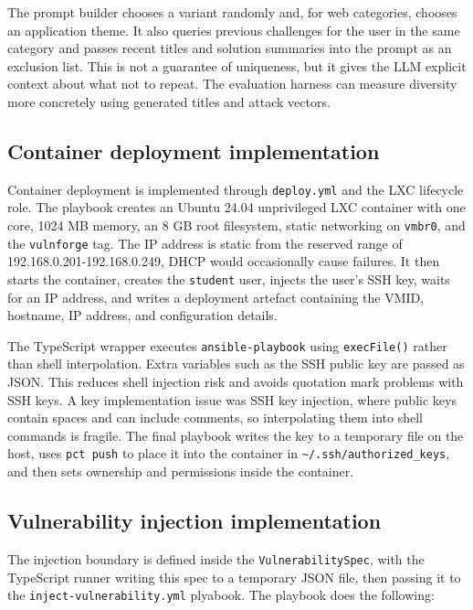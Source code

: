 The prompt builder chooses a variant randomly and, for web categories, chooses an application theme. It also queries previous challenges for the user in the same category and passes recent titles and solution summaries into the prompt as an exclusion list. This is not a guarantee of uniqueness, but it gives the LLM explicit context about what not to repeat. The evaluation harness can measure diversity more concretely using generated titles and attack vectors.

\subsection{Container deployment implementation}\label{sec:container-deployment}

Container deployment is implemented through \lstinline|deploy.yml| and the LXC lifecycle role. The playbook creates an Ubuntu 24.04 unprivileged LXC container with one core, 1024 MB memory, an 8 GB root filesystem, static networking on \lstinline|vmbr0|, and the \lstinline|vulnforge| tag. The IP address is static from the reserved range of 192.168.0.201-192.168.0.249, DHCP would occasionally cause failures. It then starts the container, creates the \lstinline|student| user, injects the user's SSH key, waits for an IP address, and writes a deployment artefact containing the VMID, hostname, IP address, and configuration details.

The TypeScript wrapper executes \lstinline|ansible-playbook| using \lstinline|execFile()| rather than shell interpolation. Extra variables such as the SSH public key are passed as JSON. This reduces shell injection risk and avoids quotation mark problems with SSH keys. A key implementation issue was SSH key injection, where public keys contain spaces and can include comments, so interpolating them into shell commands is fragile. The final playbook writes the key to a temporary file on the host, uses \lstinline|pct push| to place it into the container in \lstinline|~/.ssh/authorized_keys|, and then sets ownership and permissions inside the container.

\subsection{Vulnerability injection implementation}\label{sec:vuln-injection}

The injection boundary is defined inside the \lstinline{VulnerabilitySpec}, with the TypeScript runner writing this spec to a temporary JSON file, then passing it to the \lstinline{inject-vulnerability.yml} plyabook. The playbook does the following:

